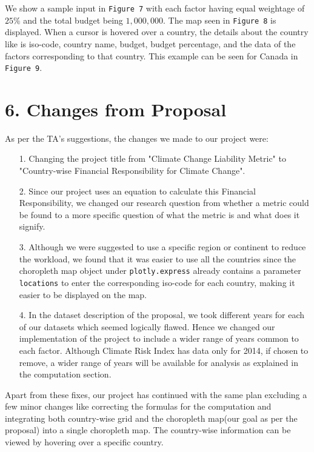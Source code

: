 \documentclass[fontsize=11pt]{article}
\begin{document}
    We show a sample input in \texttt{Figure 7} with each factor having equal weightage of $25\%$ and the total budget
    being $1,000,000$. The map seen in \texttt{Figure 8} is displayed. When a cursor is hovered over a country, the details about
    the country like is iso-code, country name, budget, budget percentage, and the data of the factors corresponding to that
    country. This example can be seen for Canada in \texttt{Figure 9}.\newline

    \section*{6. Changes from Proposal}

    As per the TA's suggestions, the changes we made to our project were:
    \begin{enumerate}
        \item [1.] Changing the project title from "Climate Change Liability Metric" to "Country-wise Financial
                    Responsibility for Climate Change".
        \item [2.] Since our project uses an equation to calculate this Financial Responsibility, we changed our
                    research question from whether a metric could be found to a more specific question of what the
                    metric is and what does it signify.
        \item [3.] Although we were suggested to use a specific region or continent to reduce the workload, we found
                    that it was easier to use all the countries since the choropleth map object under \texttt{plotly.express}
                    already contains a parameter \texttt{locations} to enter the corresponding iso-code for each country,
                    making it easier to be displayed on the map.
        \item [4.] In the dataset description of the proposal, we took different years for each of our datasets which seemed logically flawed.
                    Hence we changed our implementation of the project to include a wider range of years common to each
                    factor. Although Climate Risk Index has data only for 2014, if chosen to remove, a wider range of
                    years will be available for analysis as explained in the computation section.
    \end{enumerate}
    Apart from these fixes, our project has continued with the same plan excluding a few minor changes like correcting the
    formulas for the computation and integrating both country-wise grid and the choropleth map(our goal as per the proposal)
    into a single choropleth map. The country-wise information can be viewed by hovering over a specific country. \newline
    
\end{document}
